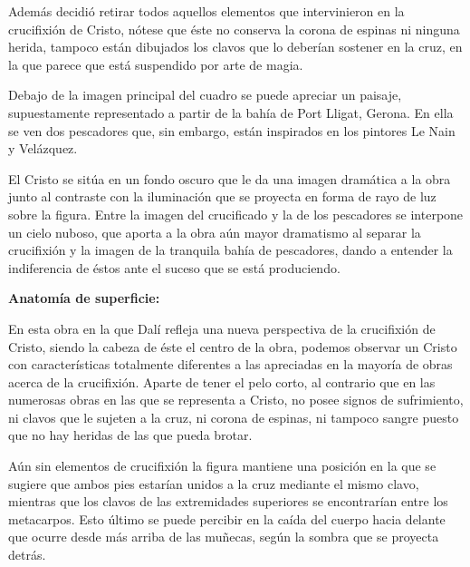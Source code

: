 Además decidió retirar todos aquellos elementos que intervinieron en la crucifixión de Cristo, nótese que éste no conserva la corona de espinas ni ninguna herida, tampoco están dibujados los clavos que lo deberían sostener en la cruz, en la que parece que está suspendido por arte de magia.

Debajo de la imagen principal del cuadro se puede apreciar un paisaje, supuestamente representado a partir de la bahía de Port Lligat, Gerona. En ella se ven dos pescadores que, sin embargo, están inspirados en los pintores Le Nain y Velázquez.\cite{RefWorks:67} %

El Cristo se sitúa en un fondo oscuro que le da una imagen dramática a la obra junto al contraste con la iluminación que se proyecta en forma de rayo de luz sobre la figura. Entre la imagen del crucificado y la de los pescadores se interpone un cielo nuboso, que aporta a la obra aún mayor dramatismo al separar la crucifixión y la imagen de la tranquila bahía de pescadores, dando a entender la indiferencia de éstos ante el suceso que se está produciendo.


\newpage
\textbf{Anatomía de superficie:}

En esta obra en la que Dalí refleja una nueva perspectiva de la crucifixión de Cristo, siendo la cabeza de éste el centro de la obra, podemos observar un Cristo con características totalmente diferentes a las apreciadas en la mayoría de obras acerca de la crucifixión. Aparte de tener el pelo corto, al contrario que en las numerosas obras en las que se representa a Cristo, no posee signos de sufrimiento, ni clavos que le sujeten a la cruz, ni corona de espinas, ni tampoco sangre puesto que no hay heridas de las que pueda brotar.

Aún sin elementos de crucifixión la figura mantiene una posición en la que se sugiere que ambos pies estarían unidos a la cruz mediante el mismo clavo, mientras que los clavos de las extremidades superiores se encontrarían entre los metacarpos. Esto último se puede percibir en la caída del cuerpo hacia delante que ocurre desde más arriba de las muñecas, según la sombra que se proyecta detrás.

